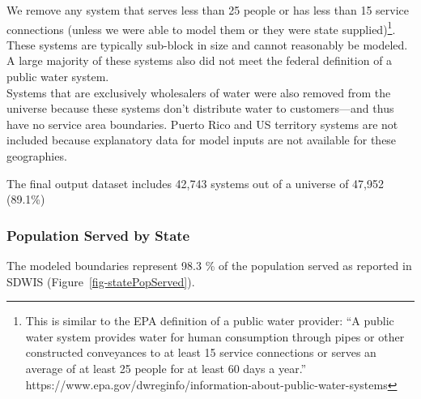 \documentclass[
  letterpaper,
  DIV=11,
  numbers=noendperiod,
  oneside]{scrartcl}
\begin{document}
We remove any system that serves less than 25 people or has less than 15
service connections (unless we were able to model them or they were
state supplied)\footnote{This is similar to the EPA definition of a
  public water provider: ``A public water system provides water for
  human consumption through pipes or other constructed conveyances to at
  least 15 service connections or serves an average of at least 25
  people for at least 60 days a year.''
  https://www.epa.gov/dwreginfo/information-about-public-water-systems}.
These systems are typically sub-block in size and cannot reasonably be
modeled. A large majority of these systems also did not meet the federal
definition of a public water system.\\
Systems that are exclusively wholesalers of water were also removed from
the universe because these systems don't distribute water to
customers---and thus have no service area boundaries. Puerto Rico and US
territory systems are not included because explanatory data for model
inputs are not available for these geographies.

The final output dataset includes 42,743 systems out of a universe of
47,952 (89.1\%)

\subsubsection{Population Served by
State}\label{population-served-by-state}

The modeled boundaries represent 98.3 \% of the population served as
reported in SDWIS (Figure~\ref{fig-statePopServed}).
\end{document}
